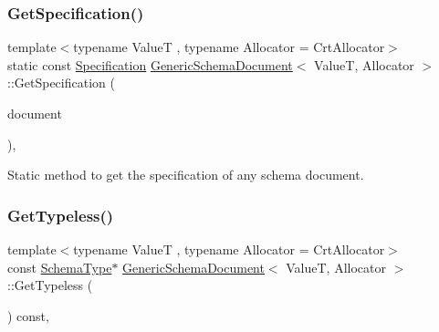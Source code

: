 \subsubsection{\texorpdfstring{Get\+Specification()}{GetSpecification()}\hspace{0.1cm}{\footnotesize\ttfamily [2/2]}}
{\footnotesize\ttfamily template$<$typename ValueT , typename Allocator  = Crt\+Allocator$>$ \\
static const \hyperlink{structSpecification}{Specification} \hyperlink{classGenericSchemaDocument}{Generic\+Schema\+Document}$<$ ValueT, Allocator $>$\+::Get\+Specification (\begin{DoxyParamCaption}\item[{const \hyperlink{classGenericSchemaDocument_ae246f1b6573a5a8a2c0d73d4eb64d53a}{Value\+Type} \&}]{document }\end{DoxyParamCaption})\hspace{0.3cm}{\ttfamily [inline]}, {\ttfamily [static]}}



Static method to get the specification of any schema document. 

\mbox{\label{classGenericSchemaDocument_a06f43ff144ff68938fedc855bcb357f2}} 
\subsubsection{\texorpdfstring{Get\+Typeless()}{GetTypeless()}}
{\footnotesize\ttfamily template$<$typename ValueT , typename Allocator  = Crt\+Allocator$>$ \\
const \hyperlink{classGenericSchemaDocument_acaf115202b159a2eb72c97c3dc6c3895}{Schema\+Type}$\ast$ \hyperlink{classGenericSchemaDocument}{Generic\+Schema\+Document}$<$ ValueT, Allocator $>$\+::Get\+Typeless (\begin{DoxyParamCaption}{ }\end{DoxyParamCaption}) const\hspace{0.3cm}{\ttfamily [inline]}, {\ttfamily [private]}}

\mbox{\label{classGenericSchemaDocument_a9cec414e479ff5ce2917eb48e53d46b4}} 
